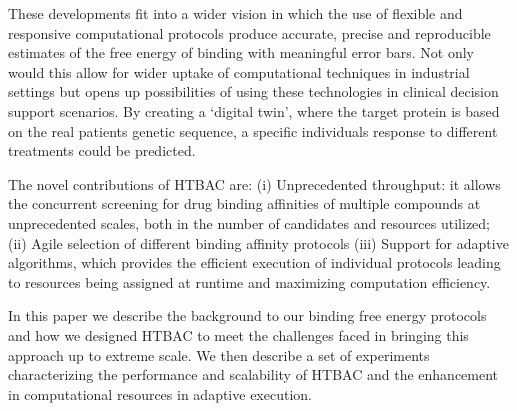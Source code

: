
These developments fit into a wider vision in which the use of
flexible and responsive computational protocols produce accurate,
precise and reproducible estimates of the free energy of binding with 
meaningful error bars. Not only would this allow for wider uptake of 
computational techniques in industrial settings but opens up possibilities 
of using these technologies in clinical decision support scenarios. By creating 
a `digital twin', where the target protein is based on the real patients 
genetic sequence, a specific individuals response to different 
treatments could be predicted. 


The novel contributions of HTBAC are: (i) Unprecedented throughput: it allows
the concurrent screening for drug binding affinities of multiple compounds at
unprecedented scales, both in the number of candidates and resources utilized;
(ii) Agile selection of different binding affinity protocols
(iii) Support for adaptive algorithms, which provides the
efficient execution of individual protocols leading to resources being assigned
at runtime and maximizing computation efficiency. 



In this paper we describe the background to our binding free energy protocols
and how we designed HTBAC to meet the challenges faced in bringing this
approach up to extreme scale. We then describe a set of experiments
characterizing the performance and scalability of HTBAC and the enhancement in 
computational resources in adaptive execution. 

